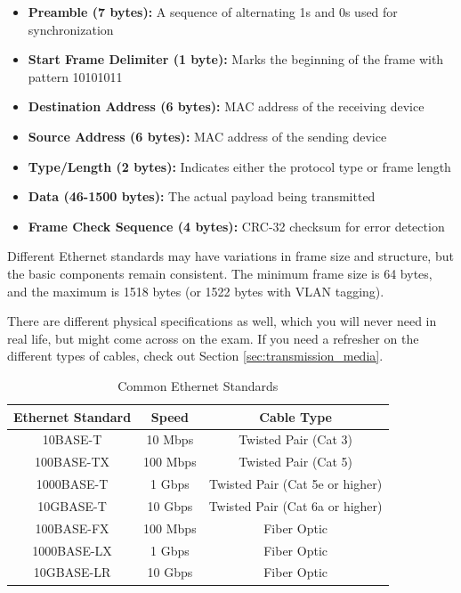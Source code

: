 \begin{itemize}
\item \textbf{Preamble (7 bytes):} A sequence of alternating 1s and 0s used for synchronization
\item \textbf{Start Frame Delimiter (1 byte):} Marks the beginning of the frame with pattern 10101011
\item \textbf{Destination Address (6 bytes):} MAC address of the receiving device
\item \textbf{Source Address (6 bytes):} MAC address of the sending device
\item \textbf{Type/Length (2 bytes):} Indicates either the protocol type or frame length
\item \textbf{Data (46-1500 bytes):} The actual payload being transmitted
\item \textbf{Frame Check Sequence (4 bytes):} CRC-32 checksum for error detection
\end{itemize}


Different Ethernet standards may have variations in frame size and structure, but the basic components remain consistent. The minimum frame size is 64 bytes, and the maximum is 1518 bytes (or 1522 bytes with VLAN tagging).

\newpage
There are different physical specifications as well, which you will never need in real life, but might come across on the exam. If you need a refresher on the different types of cables, check out Section \ref{sec:transmission_media}.

\begin{table}
    \centering
    \begin{tabular}{|c|c|c|}
        \hline
        \textbf{Ethernet Standard} & \textbf{Speed} & \textbf{Cable Type} \\
        \hline
        10BASE-T & 10 Mbps & Twisted Pair (Cat 3) \\
        100BASE-TX & 100 Mbps & Twisted Pair (Cat 5) \\
        1000BASE-T & 1 Gbps & Twisted Pair (Cat 5e or higher) \\
        10GBASE-T & 10 Gbps & Twisted Pair (Cat 6a or higher) \\
        100BASE-FX & 100 Mbps & Fiber Optic \\
        1000BASE-LX & 1 Gbps & Fiber Optic \\
        10GBASE-LR & 10 Gbps & Fiber Optic \\
        \hline
    \end{tabular}
    \caption{Common Ethernet Standards}
    \label{tab:ethernet_standards}
\end{table}

